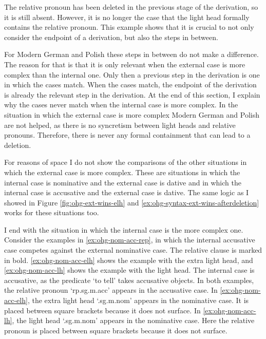 The relative pronoun has been deleted in the previous stage of the derivation, so it is still absent. However, it is no longer the case that the light head formally contains the relative pronoun. This example shows that it is crucial to not only consider the endpoint of a derivation, but also the steps in between.

For Modern German and Polish these steps in between do not make a difference. The reason for that is that it is only relevant when the external case is more complex than the internal one. Only then a previous step in the derivation is one in which the cases match. When the cases match, the endpoint of the derivation is already the relevant step in the derivation. At the end of this section, I explain why the cases never match when the internal case is more complex. In the situation in which the external case is more complex Modern German and Polish are not helped, as there is no syncretism between light heads and relative pronouns. Therefore, there is never any formal containment that can lead to a deletion.

For reasons of space I do not show the comparisons of the other situations in which the external case is more complex. These are situations in which the internal case is nominative and the external case is dative and in which the internal case is accusative and the external case is dative. The same logic as I showed in Figure \ref{fig:ohg-ext-wins-elh} and \ref{ex:ohg-syntax-ext-wins-afterdeletion} works for these situations too.

I end with the situation in which the internal case is the more complex one.
Consider the examples in \ref{ex:ohg-nom-acc-rep}, in which the internal accusative case competes against the external nominative case. The relative clause is marked in bold. \ref{ex:ohg-nom-acc-elh} shows the example with the extra light head, and \ref{ex:ohg-nom-acc-lh} shows the example with the light head.
The internal case is accusative, as the predicate  `to tell' takes accusative objects.
In both examples, the relative pronoun  `\ac{rp}.\ac{sg}.\ac{m}.\ac{acc}' appears in the accusative case.
In \ref{ex:ohg-nom-acc-elh}, the extra light head  `.\ac{sg}.\ac{m}.\ac{nom}' appears in the nominative case. It is placed between square brackets because it does not surface.
In \ref{ex:ohg-nom-acc-lh}, the light head  `.\ac{sg}.\ac{m}.\ac{nom}' appears in the nominative case. Here the relative pronoun is placed between square brackets because it does not surface.

